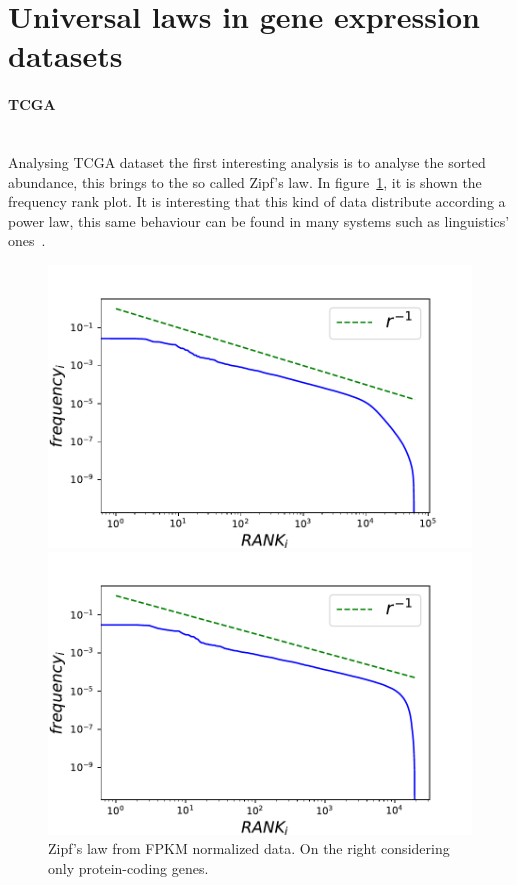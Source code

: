 \section{Universal laws in gene expression datasets}\label{sec:universallaws}
\paragraph{TCGA}\mbox{} \\
Analysing TCGA dataset the first interesting analysis is to analyse the sorted abundance, this brings to the so called Zipf's law.
In figure~\ref{fig:structure/tcga/globalZipf}, it is shown the frequency rank plot. It is interesting that this kind of data distribute according a power law, this same behaviour can be found in many systems such as linguistics' ones~\cite{altmann2016statistical}.
\begin{figure}[htb!]
	\centering
	\begin{minipage}{0.45\textwidth}
		\includegraphics[width=0.95\linewidth]{pictures/structure/tcga/globalzipf_fpkmall.pdf}
	\end{minipage}
	\hspace{3mm}
	\begin{minipage}{0.45\textwidth}
		\includegraphics[width=0.95\linewidth]{pictures/structure/tcga/globalzipf_fpkm.pdf}
	\end{minipage}
	\caption{Zipf's law from FPKM normalized data. On the right considering only protein-coding genes.}
	\label{fig:structure/tcga/globalZipf}
\end{figure}
